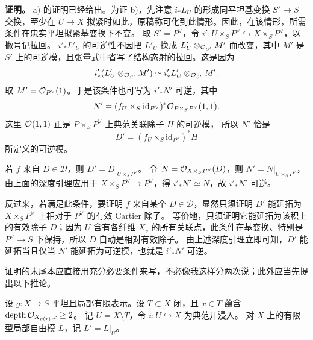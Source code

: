 \medskip\noindent\textbf{证明。}
a) 的证明已经给出。为证 b)，先注意 \(i_*L_U\) 的形成同平坦基变换 \(S'\to S\) 交换，至少在 \(U\to X\) 拟紧时如此，原稿称可化到此情形。因此，在该情形，所需条件在忠实平坦拟紧基变换下不变。
取 \(S'=P^\vee\)，令 \(i':U\times_S P^\vee\hookrightarrow X\times_S P^\vee\)，以撇号记拉回。
\(i'_*L'_U\) 的可逆性不因把 \(L'_U\) 换成 \(L'_U\otimes_{\mathcal O_{S'}}M'\) 而改变，其中 \(M'\) 是 \(S'\) 上的可逆模，且张量式中省写了结构态射的拉回。这是因为
\[
 i'_*(L'_U\otimes_{\mathcal O_{S'}} M')
 \simeq i'_*L'_U\otimes_{\mathcal O_{S'}} M' .
\]
取 \(M'=\mathcal O_{P^\vee}(1)\)。于是该条件也可写为 \(i'_*N'\) 可逆，其中
\[
 N'=(f_U\times_S\mathrm{id}_{P^\vee})^*
       \mathcal O_{P\times_S P^\vee}(1,1).
\]
这里 \(\mathcal O(1,1)\) 正是 \(P\times_S P^\vee\) 上典范关联除子 \(H\) 的可逆模，
所以 \(N'\) 恰是
\[
 D'=(f_U\times_S\mathrm{id}_{P^\vee})^*H
\]
所定义的可逆模。

若 \(f\) 来自 \(D\in\mathcal D\)，则 \(D'=D|_{U\times_S P^\vee}\)。
令 \(N=\mathcal O_{X\times_S P^\vee}(D)\)，则 \(N'=N|_{U\times_S P^\vee}\)，
由上面的深度引理应用于 \(X\times_S P^\vee\to P^\vee\)，得
\(i'_*N'\simeq N\)，故 \(i'_*N'\) 可逆。

反过来，若满足此条件，要证明 \(f\) 来自某个 \(D\in\mathcal D\)，显然只须证明 \(D'\) 能延拓为 \(X\times_S P^\vee\) 上相对于 \(P^\vee\) 的有效 Cartier 除子。
等价地，只须证明它能延拓为该积上的有效除子 \(D\)；因为 \(U\) 含有各纤维 \(X_s\) 的所有关联点，此条件在基变换、特别是 \(P^\vee\to S\) 下保持，所以 \(D\) 自动是相对有效除子。
由上述深度引理立即可知，\(D'\) 能延拓当且仅当 \(N'\) 能延拓为可逆模，也就是 \(i'_*N'\) 可逆。

证明的末尾本应直接用充分必要条件来写，不必像我这样分两次说；此外应当先提出以下推论。


设 \(g:X\to S\) 平坦且局部有限表示。设 \(T\subset X\) 闭，且
\(x\in T\) 蕴含 \(\operatorname{depth}\mathcal O_{X_{g(x)},x}\ge2\)。
记 \(U=X\setminus T\)，令 \(i:U\hookrightarrow X\) 为典范开浸入。
对 \(X\) 上的有限型局部自由模 \(L\)，记 \(L'=L|_U\)。

